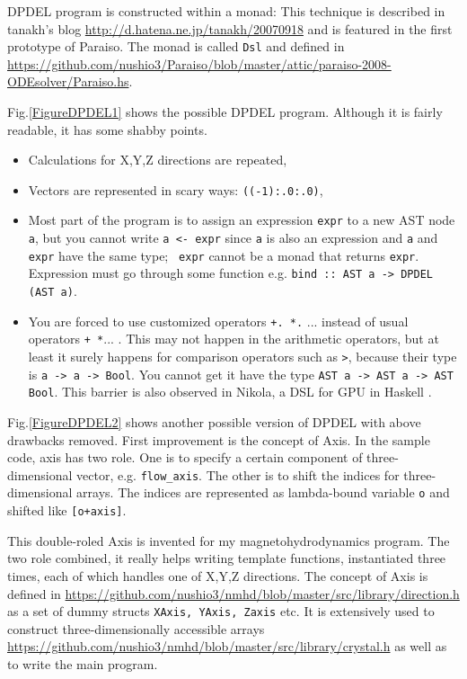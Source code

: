 \documentclass[twocolumn]{article}
\begin{document}
DPDEL program is constructed within a monad: This technique is
described in tanakh's blog \url{http://d.hatena.ne.jp/tanakh/20070918}
and is featured in the first prototype of Paraiso. The monad is called
{\tt Dsl} and defined in
\url{https://github.com/nushio3/Paraiso/blob/master/attic/paraiso-2008-ODEsolver/Paraiso.hs}.


Fig.\ref{FigureDPDEL1} shows the possible DPDEL program. Although it is fairly
readable, it has some shabby points.
\begin{itemize}
  \item Calculations for X,Y,Z directions are repeated,
  \item Vectors are represented in scary ways: {\tt ((-1):.0:.0)},
  \item Most part of the program is to assign an expression {\tt expr} to a
    new AST node {\tt a}, but you cannot write {\tt a <- expr} since {\tt a}
    is also an expression and {\tt a} and {\tt expr} have the same type; {\tt
      expr} cannot be a monad that returns {\tt expr}.  Expression must go
    through some function e.g. {\tt bind :: AST a -> DPDEL (AST a)}.
  \item You are forced to use customized operators {\tt+. *.} ... instead of
    usual operators {\tt+ *}... . This may not happen in the arithmetic
    operators, but at least it surely happens for comparison operators such as
    {\tt>}, because their type is {\tt a -> a -> Bool}. You cannot get it have
    the type {\tt AST a -> AST a -> AST Bool}. This barrier is also observed
    in Nikola, a DSL for GPU in Haskell
    \cite{Mainland:2010:NEC:1863523.1863533}.
\end{itemize}

Fig.\ref{FigureDPDEL2} shows another possible version of DPDEL with
above drawbacks removed.  First improvement is the concept of Axis. In
the sample code, axis has two role.  One is to specify a certain
component of three-dimensional vector, e.g. {\tt flow\_axis}. The
other is to shift the indices for three-dimensional arrays. The
indices are represented as lambda-bound variable {\tt o} and shifted
like {\tt [o+axis]}.

This double-roled Axis is invented for my magnetohydrodynamics
program. The two role combined, it really helps writing template
functions, instantiated three times, each of which handles one of
X,Y,Z directions. The concept of Axis is defined in
\url{https://github.com/nushio3/nmhd/blob/master/src/library/direction.h}
as a set of dummy structs {\tt XAxis, YAxis, Zaxis} etc. It is
extensively used to construct three-dimensionally accessible arrays
\url{https://github.com/nushio3/nmhd/blob/master/src/library/crystal.h}
as well as to write the main program.
\end{document}

